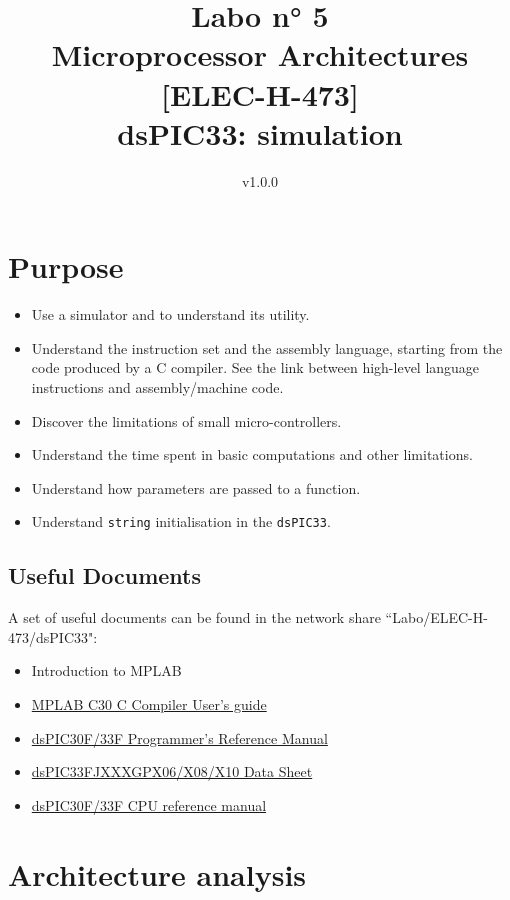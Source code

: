\documentclass[10pt,a4paper]{article}
\date{\vspace{-1cm}v1.0.0}
\title{\vspace{-2cm} Labo n° 5\\ Microprocessor Architectures [ELEC-H-473]\\ dsPIC33: simulation \ifthenelse{\boolean{corrige}}{~\\Corrigé}{}}
\theoremstyle{definition}%
\newcommand{\kw}[1]{\texttt{#1}}
\begin{document}
\maketitle

\section*{ Purpose}
\begin{itemize}
\item Use a simulator and to understand its utility.
\item Understand the instruction set and the assembly language, starting from the code produced by a C compiler. See the link between high-level language instructions and assembly/machine code.
\item Discover the limitations of small micro-controllers.
\item Understand the time spent in basic computations and other limitations.
\item Understand how parameters are passed to a function.
\item Understand \kw{string} initialisation in the \kw{dsPIC33}.
\end{itemize}


\subsection*{Useful Documents}
A set of useful documents can be found in the network share ``Labo/ELEC-H-473/dsPIC33": %
\begin{itemize}
\item Introduction to MPLAB
\item \href{http://ww1.microchip.com/downloads/en/devicedoc/c30_users_guide_51284f.pdf}{MPLAB C30 C Compiler User's guide }
\item \href{http://ww1.microchip.com/downloads/en/DeviceDoc/70157C.pdf}{dsPIC30F/33F Programmer's Reference Manual}
\item \href{http://ww1.microchip.com/downloads/en/DeviceDoc/70286C.pdf}{dsPIC33FJXXXGPX06/X08/X10 Data Sheet}
\item \href{http://ww1.microchip.com/downloads/en/DeviceDoc/70204C.pdf}{dsPIC30F/33F CPU reference manual}
\end{itemize}

\section{Architecture analysis}
\end{document}
